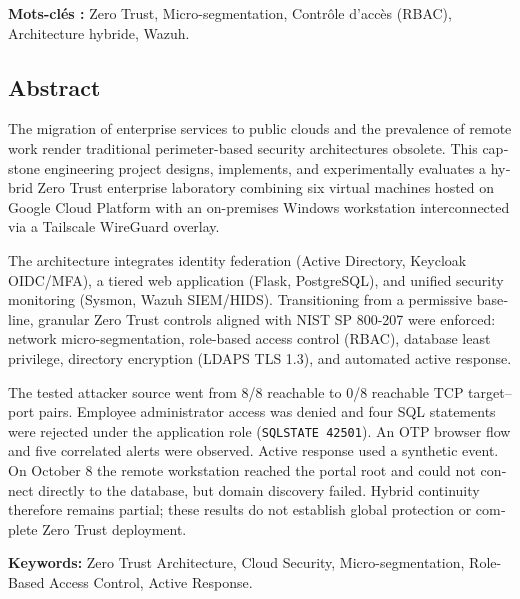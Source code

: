 \documentclass[a4paper,12pt]{report}
\begin{document}
\noindent\textbf{Mots-clés :} Zero Trust, Micro-segmentation, Contrôle d'accès (RBAC), Architecture hybride, Wazuh.

\vspace{0.8cm}
\begin{otherlanguage}{english}
\chapter*{Abstract}
The migration of enterprise services to public clouds and the prevalence of remote work render traditional perimeter-based security architectures obsolete. This capstone engineering project designs, implements, and experimentally evaluates a hybrid Zero Trust enterprise laboratory combining six virtual machines hosted on Google Cloud Platform with an on-premises Windows workstation interconnected via a Tailscale WireGuard overlay.

The architecture integrates identity federation (Active Directory, Keycloak OIDC/MFA), a tiered web application (Flask, PostgreSQL), and unified security monitoring (Sysmon, Wazuh SIEM/HIDS). Transitioning from a permissive baseline, granular Zero Trust controls aligned with NIST SP 800-207 were enforced: network micro-segmentation, role-based access control (RBAC), database least privilege, directory encryption (LDAPS TLS 1.3), and automated active response.

The tested attacker source went from 8/8 reachable to 0/8 reachable TCP target--port pairs. Employee administrator access was denied and four SQL statements were rejected under the application role (\texttt{SQLSTATE 42501}). An OTP browser flow and five correlated alerts were observed. Active response used a synthetic event. On October 8 the remote workstation reached the portal root and could not connect directly to the database, but domain discovery failed. Hybrid continuity therefore remains partial; these results do not establish global protection or complete Zero Trust deployment.

\noindent\textbf{Keywords:} Zero Trust Architecture, Cloud Security, Micro-segmentation, Role-Based Access Control, Active Response.
\end{otherlanguage}
\tableofcontents
\listoffigures
\listoftables
\end{document}
